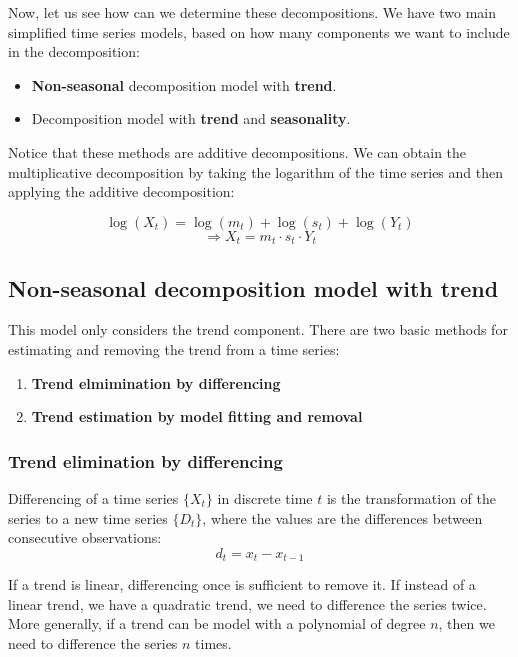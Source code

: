 Now, let us see how can we determine these decompositions. We have two main simplified
time series models, based on how many components we want to include in the decomposition:

\begin{itemize}
    \item \textbf{Non-seasonal} decomposition model with \textbf{trend}.
    \item Decomposition model with \textbf{trend} and \textbf{seasonality}.
\end{itemize}

Notice that these methods are additive decompositions. We can obtain the multiplicative
decomposition by taking the logarithm of the time series and then applying the additive
decomposition:

$$\log(X_t) = \log(m_t) + \log(s_t) + \log(Y_t)$$
$$\Rightarrow X_t = m_t \cdot s_t \cdot Y_t$$

\subsection{Non-seasonal decomposition model with trend}

This model only considers the trend component. There are two basic methods for 
estimating and removing the trend from a time series:

\begin{enumerate}
    \item \textbf{Trend elmimination by differencing}
    \item \textbf{Trend estimation by model fitting and removal}
\end{enumerate}

\subsubsection{Trend elimination by differencing}

Differencing of a time series $\{X_t\}$ in discrete time $t$ is the transformation
of the series to a new time series $\{D_t\}$, where the values are the differences
between consecutive observations:
$$d_t = x_t - x_{t-1}$$

If a trend is linear, differencing once is sufficient to remove it. If instead 
of a linear trend, we have a quadratic trend, we need to difference the series twice.
More generally, if a trend can be model with a polynomial of degree $n$, then we need
to difference the series $n$ times.

